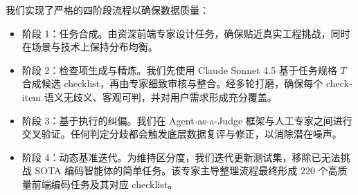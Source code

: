 我们实现了严格的四阶段流程以确保数据质量：
\begin{itemize}[leftmargin=1.5em,itemsep=2pt]
\item 阶段 1：任务合成。由资深前端专家设计任务，确保贴近真实工程挑战，同时在场景与技术上保持分布均衡。
\item 阶段 2：检查项生成与精炼。我们先使用 Claude Sonnet 4.5 基于任务规格 $T$ 合成候选 checklist，再由专家细致审核与整合。经多轮打磨，确保每个 check-item 语义无歧义、客观可判，并对用户需求形成充分覆盖。
\item 阶段 3：基于执行的纠偏。我们在 Agent-as-a-Judge 框架与人工专家之间进行交叉验证。任何判定分歧都会触发底层数据复评与修正，以消除潜在噪声。
\item 阶段 4：动态基准迭代。为维持区分度，我们迭代更新测试集，移除已无法挑战 SOTA 编码智能体的简单任务。该专家主导整理流程最终形成 220 个高质量前端编码任务及其对应 checklist。
\end{itemize}
